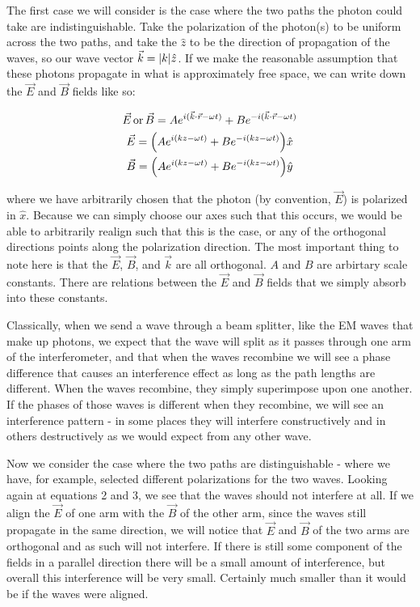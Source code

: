 \documentclass{article}
\DeclarePairedDelimiter\abs{\lvert}{\rvert}%
\DeclarePairedDelimiter{\parens}{\lparen}{\rparen}
\begin{document}
	\hspace{.5cm}

	The first case we will consider is the case where the two paths the photon could take are indistinguishable.  Take the polarization of the photon(s) to be uniform across the two paths, and take the $\hat{z}$ to be the direction of propagation of the waves, so our wave vector $\vec{k} = \abs{k}\hat{z}$.  If we make the reasonable assumption that these photons propagate in what is approximately free space, we can write down the $\vec{E}$ and $\vec{B}$ fields like so:

	\begin{gather}
		\vec{E} \, \text{or} \, \vec{B} = Ae^{i(\vec{k} \cdot \vec{r} - \omega t)} + Be^{-i(\vec{k} \cdot \vec{r} - \omega t)}\\
		\vec{E} = \parens*{Ae^{i(kz-\omega t)} + Be^{-i(kz-\omega t)}}\hat{x}\\
		\vec{B} = \parens*{Ae^{i(kz-\omega t)} + Be^{-i(kz-\omega t)}}\hat{y}
	\end{gather}

	where we have arbitrarily chosen that the photon (by convention, $\vec{E}$) is polarized in $\hat{x}$.  Because we can simply choose our axes such that this occurs, we would be able to arbitrarily realign such that this is the case, or any of the orthogonal directions points along the polarization direction.  The most important thing to note here is that the $\vec{E}$, $\vec{B}$, and $\vec{k}$ are all orthogonal.  $A$ and $B$ are arbirtary scale constants.  There are relations between the $\vec{E}$ and $\vec{B}$ fields that we simply absorb into these constants.

	\hspace{.5cm}

	Classically, when we send a wave through a beam splitter, like the EM waves that make up photons, we expect that the wave will split as it passes through one arm of the interferometer, and that when the waves recombine we will see a phase difference that causes an interference effect as long as the path lengths are different.  When the waves recombine, they simply superimpose upon one another.  If the phases of those waves is different when they recombine, we will see an interference pattern - in some places they will interfere constructively and in others destructively as we would expect from any other wave.

	\hspace{.5cm}

	Now we consider the case where the two paths are distinguishable - where we have, for example, selected different polarizations for the two waves.  Looking again at equations 2 and 3, we see that the waves should not interfere at all.  If we align the $\vec{E}$ of one arm with the $\vec{B}$ of the other arm, since the waves still propagate in the same direction, we will notice that $\vec{E}$ and $\vec{B}$ of the two arms are orthogonal and as such will not interfere.  If there is still some component of the fields in a parallel direction there will be a small amount of interference, but overall this interference will be very small.  Certainly much smaller than it would be if the waves were aligned.
\end{document}
